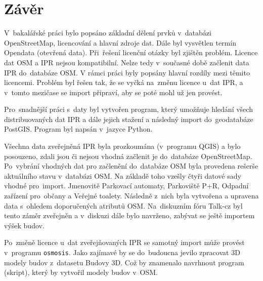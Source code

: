 \chapter{Závěr}
\label{5-zaver}

V~bakalářské práci bylo popsáno základní dělení prvků v~databázi
OpenStreetMap, licencování a hlavní zdroje dat. Dále byl vysvětlen termín
Opendata (otevřená data).
Při~řešení licenční otázky byl zjištěn problém. Licence dat
OSM a IPR nejsou kompatibilní. Nelze tedy v~současné době začlenit
data IPR do~databáze OSM. V rámci práci byly popsány hlavní rozdíly mezi těmito licencemi.
Problém byl řešen tak, že se vyčká na~změnu licence u~dat IPR, a
v~tomto mezičase se import připraví, aby se poté mohl už jen provést.


Pro~snadnější práci s~daty byl vytvořen program, který umožňuje hledání
všech distribuovaných dat IPR a dále jejich stažení a
následný import do~geodatabáze PostGIS. Program byl napsán v~jazyce
Python.


Všechna data zveřejněná IPR byla prozkoumána (v~programu QGIS)
a bylo posouzeno, zdali jsou či nejsou vhodná začlenit je do~databáze
OpenStreetMap. Po~vybrání vhodných dat pro začlenění do~databáze OSM byla
provedena rešerše aktuálního stavu v~databázi OSM.
Na základě toho vzešly čtyři datové sady vhodné pro~import.
Jmenovitě Parkovací automaty, Parkoviště P+R, Odpadní zařízení
pro~občany a Veřejné toalety. Následně z~nich byla vytvořena a upravena
data s~ohledem doporučených atributů OSM.
Na~diskuzním fóru Talk-cz byl tento záměr zveřejněn a v~diskuzi dále bylo
navrženo, zabývat se ještě importem výšek budov.


Po~změně licence u~dat zveřejňovaných IPR se samotný import může provést
v~programu {\tt osmosis}.
Jako zajímavé by se do~budoucna jevilo zpracovat 3D modely budov
z~datasetu Budovy 3D. Což by znamenalo navrhnout program (skript), který by vytvořil
modely budov v~OSM.
